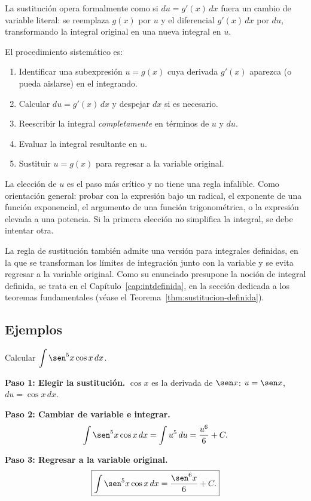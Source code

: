 La sustitución opera formalmente como si $du = g'(x)\,dx$ fuera un cambio de
variable literal: se reemplaza $g(x)$ por $u$ y el diferencial $g'(x)\,dx$
por $du$, transformando la integral original en una nueva integral en $u$.

\begin{pasos}
El procedimiento sistemático es:
\begin{enumerate}
    \item Identificar una subexpresión $u = g(x)$ cuya derivada $g'(x)$
    aparezca (o pueda aislarse) en el integrando.
    \item Calcular $du = g'(x)\,dx$ y despejar $dx$ si es necesario.
    \item Reescribir la integral \emph{completamente} en términos de $u$ y
    $du$.
    \item Evaluar la integral resultante en $u$.
    \item Sustituir $u = g(x)$ para regresar a la variable original.
\end{enumerate}
\end{pasos}

\begin{rem}
La elección de $u$ es el paso más crítico y no tiene una regla infalible.
Como orientación general: probar con la expresión bajo un radical, el
exponente de una función exponencial, el argumento de una función
trigonométrica, o la expresión elevada a una potencia. Si la primera
elección no simplifica la integral, se debe intentar otra.
\end{rem}

\begin{rem}
La regla de sustitución también admite una versión para integrales
definidas, en la que se transforman los límites de integración junto con la
variable y se evita regresar a la variable original. Como su enunciado
presupone la noción de integral definida, se trata en el
Capítulo~\ref{cap:intdefinida}, en la sección dedicada a los teoremas
fundamentales (véase el Teorema~\ref{thm:sustitucion-definida}).
\end{rem}

\subsection{Ejemplos}

\begin{example}
Calcular $\displaystyle\int \sen^5 x \cos x\, dx$.

\begin{myproof}

\textbf{Paso 1: Elegir la sustitución.}
$\cos x$ es la derivada de $\sen x$: $u = \sen x$, $du = \cos x\, dx$.

\textbf{Paso 2: Cambiar de variable e integrar.}
\[
\int \sen^5 x \cos x\, dx = \int u^5\, du = \frac{u^6}{6} + C.
\]

\textbf{Paso 3: Regresar a la variable original.}
\[
\boxed{\int \sen^5 x \cos x\, dx = \frac{\sen^6 x}{6} + C.}
\]
\end{myproof}
\end{example}


